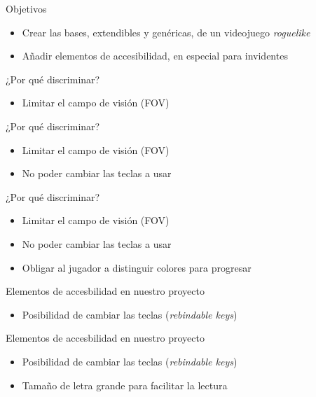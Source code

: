 
\begin{tframe}{Objetivos}
	\begin{itemize}
		\item Crear las bases, extendibles y genéricas, de un videojuego \textit{roguelike}
		\item<+-| alert@+> Añadir elementos de accesibilidad, en especial para invidentes
	\end{itemize}
\end{tframe}

\begin{tframe}{¿Por qué discriminar?}
	\begin{itemize}
			\item<+-| alert@+> Limitar el campo de visión (FOV)	
	\end{itemize}
\end{tframe}

\begin{tframe}{¿Por qué discriminar?}
	\begin{itemize}
		\item Limitar el campo de visión (FOV)
		\item<+-| alert@+> No poder cambiar las teclas a usar
	\end{itemize}
\end{tframe}

\begin{tframe}{¿Por qué discriminar?}
	\begin{itemize}
		\item Limitar el campo de visión (FOV)
		\item No poder cambiar las teclas a usar
		\item<+-| alert@+> Obligar al jugador a distinguir colores para progresar
	\end{itemize}
\end{tframe}


\begin{tframe}{Elementos de accesbilidad en nuestro proyecto}
	\begin{itemize}
		\item<+-| alert@+> Posibilidad de cambiar las teclas (\textit{rebindable keys})
	\end{itemize}
\end{tframe}

\begin{tframe}{Elementos de accesbilidad en nuestro proyecto}
	\begin{itemize}
		\item Posibilidad de cambiar las teclas (\textit{rebindable keys})
		\item<+-| alert@+> Tamaño de letra grande para facilitar la lectura
	\end{itemize}
\end{tframe}

